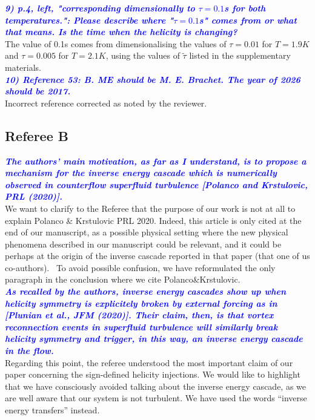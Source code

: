 \documentclass[a4paper,10pt]{article}
\def\blue#1{\textcolor{blue}{#1}}
\def\refcomment#1{\textbf{\blue{\emph{#1}}}\\}
\begin{document}
    \refcomment{9) p.4, left, "corresponding dimensionally to $\tau = 0.1$s for both
    temperatures.": Please describe where "$\tau = 0.1$s" comes from or what
    that means. Is the time when the helicity is changing?}
    
    The value of 0.1s comes from dimensionalising the values of $\tau=0.01$ for $T=1.9K$ and $\tau=0.005$ for $T=2.1K$, using the values of $\tilde{\tau}$ listed in the supplementary materials. \\
    
    \refcomment{10) Reference 53: B. ME should be M. E. Brachet. The year of 2026
    should be 2017.}

    Incorrect reference corrected as noted by the reviewer.\\

\subsection*{Referee B}

\refcomment{The authors’ main motivation, as far as I understand, is to propose a mechanism for the inverse energy cascade which is numerically observed in counterflow superfluid turbulence [Polanco and Krstulovic, PRL (2020)].}

We want to clarify to the Referee that the purpose of our work is not at all to explain Polanco \& Krstulovic PRL 2020. Indeed, this article is only cited at the end of our manuscript, as a possible physical setting where the new physical phenomena described in our manuscript could be relevant, and it could be perhaps at the origin of the inverse cascade reported in that paper (that one of us co-authors).  To avoid possible confusion, we have reformulated the only paragraph in the conclusion where we cite Polanco\&Krstulovic.\\

\refcomment{As recalled by the authors, inverse energy cascades show up when helicity symmetry is explicitely broken by external forcing as in [Plunian et al., JFM (2020)]. Their claim, then, is that vortex reconnection events in superfluid turbulence will similarly break helicity symmetry and trigger, in this way, an inverse energy cascade in the flow.}

Regarding this point, the referee understood the most important claim of our paper concerning the sign-defined helicity injections. We would like to highlight that we have consciously avoided talking about the inverse energy cascade, as we are well aware that our system is not turbulent. We have used the words “inverse energy transfers” instead.\\
\end{document}
